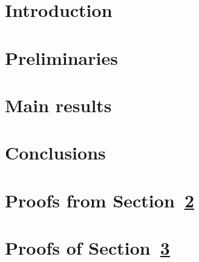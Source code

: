 \documentclass[a4paper,UKenglish]{lipics-v2021}
\begin{document}
	
	\maketitle
	
	
	
	\section{Introduction}\label{sec:introduction}
	
	
	
	\section{Preliminaries}\label{sec:preliminaries}
	
	
	
	\section{Main results}\label{sec:results}
	
	
	
	\section{Conclusions}\label{sec:conclusions}
	
	
	
	\newpage
	
	
	
	\newpage
	\appendix
	
	\section{Proofs from Section~\ref{sec:preliminaries}}
	
	
	
	\section{Proofs of Section~\ref{sec:results}}
	
	
	
\end{document}

